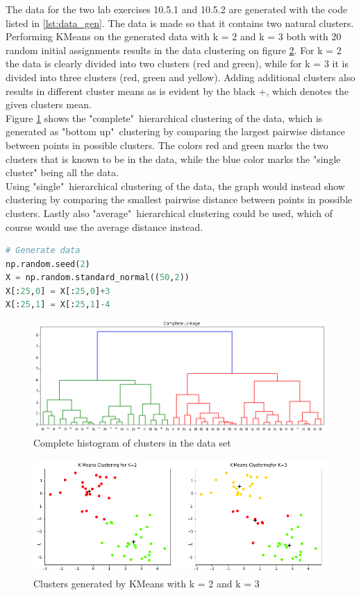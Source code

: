 The data for the two lab exercises 10.5.1 and 10.5.2 are generated with the code listed in \ref{lst:data_gen}. The data is made so that it contains two natural clusters.\\ 
Performing KMeans on the generated data with k = 2 and k = 3 both with 20 random initial assignments results in the data clustering on figure \ref{fig:KMeans}. For k = 2 the data is clearly divided into two clusters (red and green), while for k = 3 it is divided into three clusters (red, green and yellow). Adding additional clusters also results in different cluster means as is evident by the black +, which denotes the given clusters mean.\\
Figure \ref{fig:HC_Complete} shows the "complete"\ hierarchical clustering of the data, which is generated as "bottom up"\ clustering by comparing the largest pairwise distance between points in possible clusters. The colors red and green marks the two clusters that is known to be in the data, while the blue color marks the "single cluster" being all the data.\\ 
Using "single"\ hierarchical clustering of the data, the graph would instead show clustering by comparing the smallest pairwise distance between points in possible clusters. Lastly also "average"\ hierarchical clustering could be used, which of course would use the average distance instead.


\begin{lstlisting}[language=Python, caption=Code for generating the data]
# Generate data
np.random.seed(2)
X = np.random.standard_normal((50,2))
X[:25,0] = X[:25,0]+3
X[:25,1] = X[:25,1]-4
\end{lstlisting}\label{lst:data_gen}


\begin{figure}[H]
	\centering
	\includegraphics[width=14cm]{Img/HC_Complete.PNG}
	\caption{Complete histogram of clusters in the data set}
	\label{fig:HC_Complete}
\end{figure}

\begin{figure}[H]
	\centering
	\includegraphics[width=14cm]{Img/KMeans.PNG}
	\caption{Clusters generated by KMeans with k = 2 and k = 3}
	\label{fig:KMeans}
\end{figure} 

